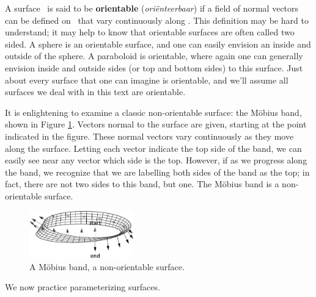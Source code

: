 A surface \surfaceS\ is said to be \textbf{orientable} (\textit{ori\"enteerbaar}) if a field of normal vectors can be defined on \surfaceS\ that vary continuously along \surfaceS. This definition may be hard to understand; it may help to know that orientable surfaces are often called two sided. A sphere is an orientable surface, and one can easily envision an inside and outside of the sphere. A paraboloid is orientable, where again one can generally envision  inside and outside sides (or top and bottom sides) to this surface. Just about every surface that one can imagine is orientable, and we'll assume all surfaces we deal with in this text are orientable.

It is enlightening to examine a classic non-orientable surface: the M\"obius band, shown in Figure \ref{fig_Vector_Calc_19}. Vectors normal to the surface are given, starting at the point indicated in the figure. These normal vectors vary continuously as they move along the surface. Letting each vector indicate the top side of the band, we can easily see near any vector which side is the top.
However, if as we progress along the band, we recognize that we are labelling both sides of the band as the top; in fact, there are not two sides to this band, but one. The M\"obius band is a non-orientable surface.


\begin{figure}[H]
	\begin{center}
			\includegraphics[width=0.4\textwidth]{fig_Vector_Calc_19}
	\caption{A M\"obius band, a non-orientable surface.}
	\label{fig_Vector_Calc_19}
	\end{center}
\end{figure}




We now practice  parameterizing surfaces.



